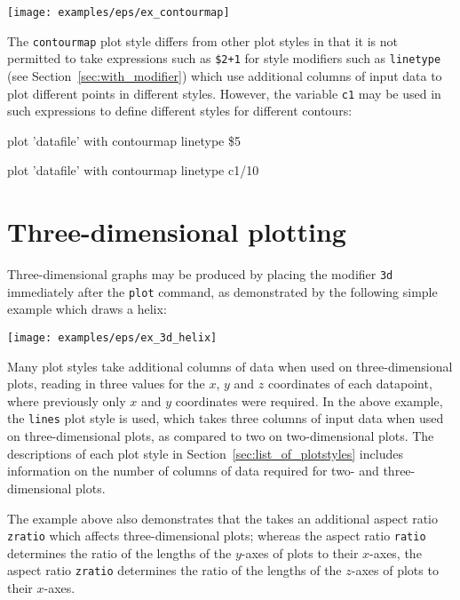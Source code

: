 \centerline{\texttt{[image: examples/eps/ex\_contourmap]}}
\vspace{2mm}

The {\tt contourmap} plot style differs from other plot styles in that it is
not permitted to take expressions such as {\tt \$2+1} for style modifiers such
as {\tt linetype} (see Section~\ref{sec:with_modifier}) which use additional
columns of input data to plot different points in different styles. However,
the variable {\tt c1} may be used in such expressions to define different
styles for different contours:

\begin{dontdo}
plot 'datafile' with contourmap linetype \$5
\end{dontdo}

\begin{dodo}
plot 'datafile' with contourmap linetype c1/10
\end{dodo}

\section{Three-dimensional plotting}
\label{sec:threedim}

Three-dimensional graphs may be produced by placing the modifier {\tt 3d}
immediately after the {\tt plot} command, as demonstrated by the following
simple example which draws a helix:

\vspace{2mm}

\vspace{2mm}

\centerline{\texttt{[image: examples/eps/ex\_3d\_helix]}}
\vspace{2mm}

Many plot styles take additional columns of data when used on
three-dimen\-sional plots, reading in three values for the $x$, $y$ and $z$
coordinates of each datapoint, where previously only $x$ and $y$ coordinates
were required. In the above example, the {\tt lines} plot style is used, which
takes three columns of input data when used on three-dimensional plots, as
compared to two on two-dimensional plots.  The descriptions of each plot style
in Section~\ref{sec:list_of_plotstyles} includes information on the number of
columns of data required for two- and three-dimensional plots. 

The example above also demonstrates that the  takes an
additional aspect ratio {\tt zratio} which affects three-dimensional plots;
whereas the aspect ratio {\tt ratio} determines the ratio of the lengths of the
$y$-axes of plots to their $x$-axes, the aspect ratio {\tt zratio} determines
the ratio of the lengths of the $z$-axes of plots to their $x$-axes.

